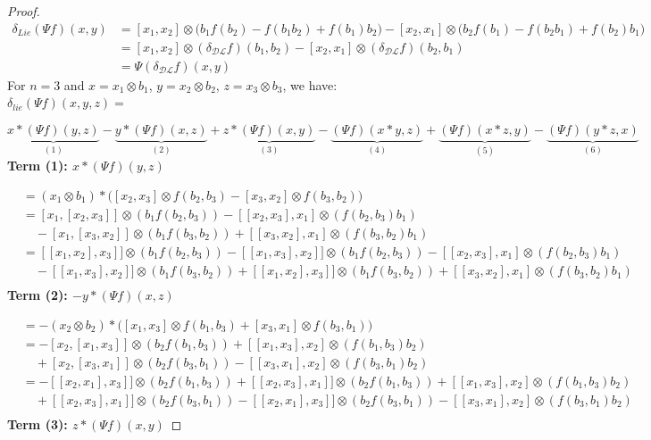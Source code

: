\documentclass[10pt,a4paper]{amsart}
\newcommand{\DL}{\mathcal{DL}}
\begin{document}
\begin{proof}
\[
\begin{aligned}
\delta_{Lie}(\Psi f)(x,y)&=[x_1,x_2]\otimes \Big( b_1  f(b_2)-f(b_1b_2)+ f(b_1)b_2\Big)-[x_2,x_1]\otimes \Big( b_2f(b_1)  -f(b_2b_1) +f(b_2)b_1\Big)\\
&=[x_1,x_2]\otimes (\delta_{\DL}f)(b_1,b_2)-[x_2,x_1]\otimes (\delta_{\DL}f)(b_2,b_1)\\
&=\Psi(\delta_{\DL}f)(x,y)
\end{aligned}
\]
For $n=3$ and $x =x_1  \otimes b_1$, $y = x_2 \otimes b_2$, $z = x_3 \otimes b_3$, we have: $\delta_{lie}(\Psi f)(x,y,z) =$

\[
 \underbrace{x \ast (\Psi f)(y,z)}_{(1)} -\underbrace{y \ast (\Psi f)(x,z)}_{(2)}+\underbrace{z \ast (\Psi f)(x,y)}_{(3)}- \underbrace{(\Psi f)(x \ast y, z)}_{(4)} + \underbrace{(\Psi f)(x\ast z, y )}_{(5)}-\underbrace{(\Psi f)(y\ast z, x )}_{(6)} 
\]
\textbf{Term (1): $x \ast (\Psi f)(y,z)$}

\begin{align*}
&= (x_1 \otimes b_1) \ast \Big([x_2 , x_3] \otimes f(b_2,b_3) - [x_3, x_2] \otimes f(b_3,b_2)\Big) \\
&= [x_1, [x_2 , x_3]] \otimes (b_1  f(b_2,b_3)) - [[x_2, x_3], x_1] \otimes ( f(b_2,b_3)b_1) \\
&\quad - [x_1, [x_3, x_2]] \otimes (b_1  f(b_3,b_2)) + [[x_3, x_2], x_1] \otimes (f(b_3,b_2)b_1)\\
&=[[x_1, x_2], x_3]] \otimes (b_1  f(b_2,b_3))-[[x_1, x_3], x_2]] \otimes (b_1  f(b_2,b_3)) - [[x_2, x_3],x_1] \otimes (f(b_2,b_3)b_1) \\
&\quad - [[x_1, x_3], x_2]] \otimes (b_1  f(b_3,b_2))+[[x_1, x_2], x_3]] \otimes (b_1  f(b_3,b_2)) + [[x_3, x_2], x_1] \otimes (f(b_3,b_2)b_1)\\
\end{align*}
\textbf{Term (2): $-y \ast (\Psi f)(x,z)$}

\begin{align*}
&= -(x_2 \otimes b_2) \ast \Big([x_1 , x_3] \otimes f(b_1,b_3) + [x_3, x_1] \otimes f(b_3,b_1)\Big) \\
&= -[x_2, [x_1, x_3]] \otimes (b_2  f(b_1,b_3)) + [[x_1, x_3], x_2] \otimes ( f(b_1,b_3)b_2) \\
&\quad + [x_2, [x_3, x_1]] \otimes (b_2  f(b_3,b_1)) - [[x_3, x_1], x_2] \otimes (f(b_3,b_1)b_2)\\
&= -[[x_2, x_1], x_3]] \otimes (b_2  f(b_1,b_3))+[[x_2, x_3], x_1]] \otimes (b_2  f(b_1,b_3)) + [[x_1, x_3], x_2] \otimes ( f(b_1,b_3)b_2) \\
&\quad + [[x_2, x_3], x_1]] \otimes (b_2  f(b_3,b_1))- [[x_2, x_1], x_3]] \otimes (b_2  f(b_3,b_1)) - [[x_3, x_1], x_2] \otimes (f(b_3,b_1)b_2)\\
\end{align*}
\textbf{Term (3): $z \ast (\Psi f)(x,y)$}


\end{proof}
\end{document}
